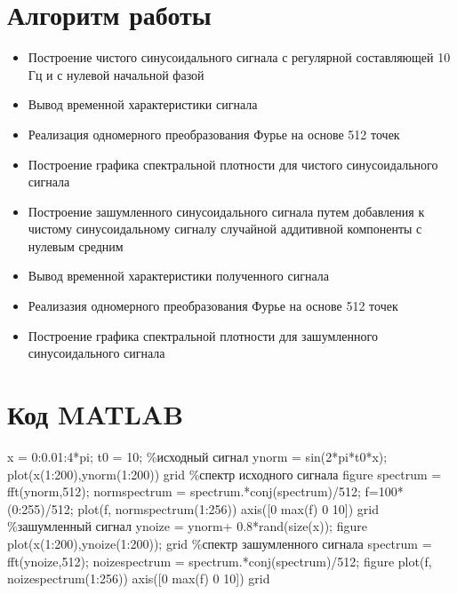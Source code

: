 \documentclass[10pt,a4paper]{report}
\begin{document}
\section{Алгоритм работы}
\begin{itemize}
\item Построение чистого синусоидального сигнала с регулярной составляющей 10 Гц и с нулевой начальной фазой
\item Вывод временной характеристики сигнала
\item Реализация одномерного преобразования Фурье на основе 512 точек
\item Построение графика спектральной плотности для чистого синусоидального сигнала
\item Построение зашумленного синусоидального сигнала путем добавления к чистому синусоидальному сигналу случайной аддитивной компоненты с нулевым средним
\item Вывод временной характеристики полученного сигнала
\item Реализазия одномерного преобразования Фурье на основе 512 точек
\item Построение графика спектральной плотности для зашумленного синусоидального сигнала
\end{itemize}
\section{Код MATLAB}
x = 0:0.01:4*pi;\newline
t0 = 10;\newline
\%исходный сигнал\newline
ynorm = sin(2*pi*t0*x);\newline
plot(x(1:200),ynorm(1:200))\newline
grid\newline
\%спектр исходного сигнала\newline
figure\newline
spectrum = fft(ynorm,512);\newline
normspectrum = spectrum.*conj(spectrum)/512;\newline
f=100*(0:255)/512;\newline
plot(f, normspectrum(1:256))\newline
axis([0 max(f) 0 10])\newline
grid\newline
\%зашумленный сигнал\newline
ynoize = ynorm+ 0.8*rand(size(x));\newline
figure\newline
plot(x(1:200),ynoize(1:200));\newline
grid\newline
\%спектр зашумленного сигнала\newline
spectrum = fft(ynoize,512);\newline
noizespectrum = spectrum.*conj(spectrum)/512;\newline
figure\newline
plot(f, noizespectrum(1:256))\newline
axis([0 max(f) 0 10])\newline
grid\newline
\end{document}
